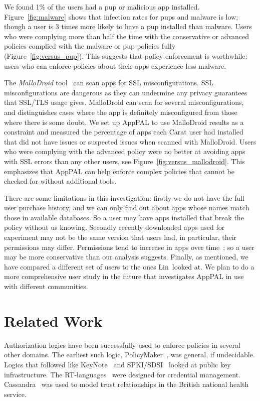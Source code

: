 \documentclass[]{llncs}
\newcommand{\citep}[1]{\cite{#1}}
\begin{document}
We found 1\% of the users had a \ac{pup} or malicious app installed.
Figure~\ref{fig:malware} shows that infection rates for \ac{pup}s and malware is low;
though a user is 3 times more likely to have a \ac{pup} installed than malware.
Users who were complying more than half the time with the conservative or advanced policies complied with the malware or \ac{pup} policies fully (Figure~\autoref{fig:versus_pup}).
This suggests that policy enforcement is worthwhile: users who can enforce policies about their apps experience less malware.

The \emph{MalloDroid} tool~\citep{Fahl:2012dj} can scan apps for SSL misconfigurations.
SSL misconfigurations are dangerous as they can undermine any privacy guarantees that SSL/TLS usage gives.
MalloDroid can scan for several misconfigurations, and distinguishes cases where the app is definitely misconfigured from those where there is some doubt.
We set up AppPAL to use MalloDroid results as a constraint and measured the percentage of apps each Carat user had installed that did not have issues or suspected issues when scanned with MalloDroid.
Users who were complying with the advanced policy were no better at avoiding apps with SSL errors than any other users, see Figure~\autoref{fig:versus_mallodroid}.
This emphasizes that AppPAL can help enforce complex policies that cannot be checked for without additional tools.

There are some limitations in this investigation: firstly
we do not have the full user purchase history, and we can only find out about apps whose names match those in available databases.
So a user may have apps installed that break the policy without us knowing.
Secondly recently downloaded apps used for experiment may not be the same version that users had, in particular, their permissions may differ.
Permissions tend to increase in apps over time~\cite{Wei:2012id}; so a user may be more conservative than our analysis suggests.
Finally, as mentioned, we have compared a different set of users to the ones Lin~\etal looked at.
We plan to do a more comprehensive user study in the future that investigates AppPAL in use with different communities.

\section{Related Work}

Authorization logics have been successfully used to enforce policies in several other domains.
The earliest such logic, PolicyMaker~\cite{Blaze:dj}, was general, if undecidable.
Logics that followed like KeyNote~\cite{Blaze:1999fa} and SPKI/SDSI~\cite{Ellison:1999ui} looked at public key infrastructure.
The RT-languages~\cite{Li:2002if} were designed for credential management.
Cassandra~\cite{Becker:2004fi} was used to model trust relationships in the British national health service.
\end{document}
